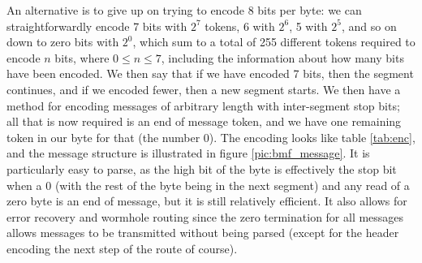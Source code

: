 \documentclass[pdftex,a4paper]{article}
\newif\ifpdf
\begin{document}
\ifpdf
\begin{figure}[htb]
  \begin{center}
    \texttt{[image: bmf\_message.pdf]}
    \caption{Illustration of the BMF message structure. Each message
    consists of a leader bit (indicating whether the message is
    `intelligent') followed by a number of variable length segments,
    where each segment is a sequence of bytes. A BMF message is
    terminated by an EOM byte, which has all bits set to zero. }
    \label{pic:bmf_message}
  \end{center}
\end{figure}
\fi

An alternative is to give up on trying to encode 8 bits per byte: we
can straightforwardly encode 7 bits with $2^7$ tokens, 6 with $2^6$, 5
with $2^5$, and so on down to zero bits with $2^0$, which sum to a
total of 255 different tokens required to encode $n$ bits, where $0
\le n \le 7$, including the information about how many bits have been
encoded. We then say that if we have encoded 7 bits, then the segment
continues, and if we encoded fewer, then a new segment starts. We then
have a method for encoding messages of arbitrary length with
inter-segment stop bits; all that is now required is an end of message
token, and we have one remaining token in our byte for that (the
number 0). The encoding looks like table \ref{tab:enc}, and the
message structure is illustrated in figure \ref{pic:bmf_message}. It
is particularly easy to parse, as the high bit of the byte is
effectively the stop bit when a 0 (with the rest of the byte being in
the next segment) and any read of a zero byte is an end of message,
but it is still relatively efficient. It also allows for error
recovery and wormhole routing since the zero termination for all
messages allows messages to be transmitted without being parsed
(except for the header encoding the next step of the route of course).
\end{document}
